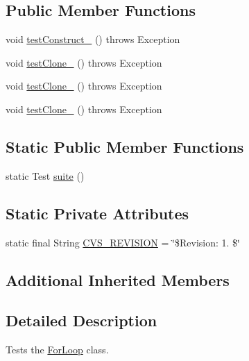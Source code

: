 \subsection*{Public Member Functions}
\begin{DoxyCompactItemize}
\item 
void \hyperlink{classorg_1_1jgap_1_1gp_1_1function_1_1_for_loop_test_a2ad915ffa5099364b8734c142efa45b9}{test\-Construct\-\_} ()  throws Exception 
\item 
void \hyperlink{classorg_1_1jgap_1_1gp_1_1function_1_1_for_loop_test_a0cad8fe3a809aec9dabe980ea1eaae90}{test\-Clone\-\_} ()  throws Exception 
\item 
void \hyperlink{classorg_1_1jgap_1_1gp_1_1function_1_1_for_loop_test_ac4afaa2c0e6baadecbc72388e8ec1a14}{test\-Clone\-\_} ()  throws Exception 
\item 
void \hyperlink{classorg_1_1jgap_1_1gp_1_1function_1_1_for_loop_test_a35b29784b935ac41baefa069cae18936}{test\-Clone\-\_} ()  throws Exception 
\end{DoxyCompactItemize}
\subsection*{Static Public Member Functions}
\begin{DoxyCompactItemize}
\item 
static Test \hyperlink{classorg_1_1jgap_1_1gp_1_1function_1_1_for_loop_test_a1b59fbc453f24ab90fec6ea2a23aa889}{suite} ()
\end{DoxyCompactItemize}
\subsection*{Static Private Attributes}
\begin{DoxyCompactItemize}
\item 
static final String \hyperlink{classorg_1_1jgap_1_1gp_1_1function_1_1_for_loop_test_ad665a54d045a8925858ecee0d2489d4a}{C\-V\-S\-\_\-\-R\-E\-V\-I\-S\-I\-O\-N} = \char`\"{}\$Revision\-: 1. \$\char`\"{}
\end{DoxyCompactItemize}
\subsection*{Additional Inherited Members}


\subsection{Detailed Description}
Tests the \hyperlink{classorg_1_1jgap_1_1gp_1_1function_1_1_for_loop}{For\-Loop} class.

